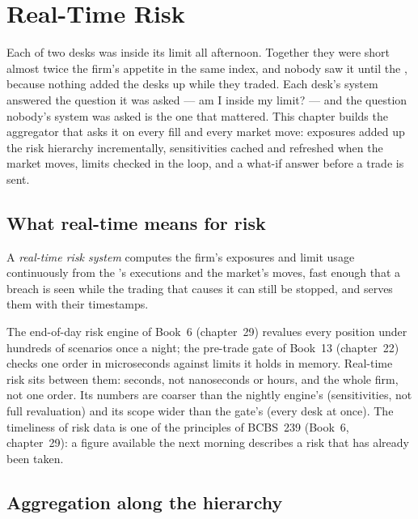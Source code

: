 \chapter{Real-Time Risk}\label{ch:pl:real-time-risk}

Each of two desks was inside its limit all afternoon. Together they were short almost twice the firm's appetite in the same index, and
nobody saw it until the , because nothing added the desks up while they traded. Each desk's system answered the question
it was asked --- am I inside my limit? --- and the question nobody's system was asked is the one that mattered. This chapter builds the
aggregator that asks it on every fill and every market move: exposures added up the risk hierarchy incrementally, sensitivities cached and
refreshed when the market moves, limits checked in the loop, and a what-if answer before a trade is sent.

\section{What real-time means for risk}

\begin{definition}\label{def:pl:real-time-risk:system}
A \emph{real-time risk system} computes the firm's exposures and limit usage continuously from the 's executions and the market's moves, fast enough that a breach is seen while the trading that causes it can still be stopped, and
serves them with their timestamps.
\end{definition}

The end-of-day risk engine of Book~6 (chapter~29) revalues every position under hundreds of scenarios once a night; the pre-trade gate of
Book~13 (chapter~22) checks one order in microseconds against limits it holds in memory. Real-time risk sits between them: seconds, not
nanoseconds or hours, and the whole firm, not one order. Its numbers are coarser than the nightly engine's (sensitivities, not full
revaluation) and its scope wider than the gate's (every desk at once). The timeliness of risk data is one of the principles of BCBS~239
(Book~6, chapter~29): a figure available the next morning describes a risk that has already been taken.

\section{Aggregation along the hierarchy}

